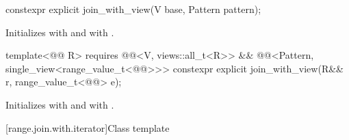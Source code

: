 %
\begin{itemdecl}
constexpr explicit join_with_view(V base, Pattern pattern);
\end{itemdecl}

\begin{itemdescr}
\pnum
\effects
Initializes  with  and
 with .
\end{itemdescr}

%
\begin{itemdecl}
template<@@ R>
  requires @@<V, views::all_t<R>> &&
           @@<Pattern, single_view<range_value_t<@@>>>
constexpr explicit join_with_view(R&& r, range_value_t<@@> e);
\end{itemdecl}

\begin{itemdescr}
\pnum
\effects
Initializes  with  and
 with .
\end{itemdescr}

[range.join.with.iterator]{Class template }

